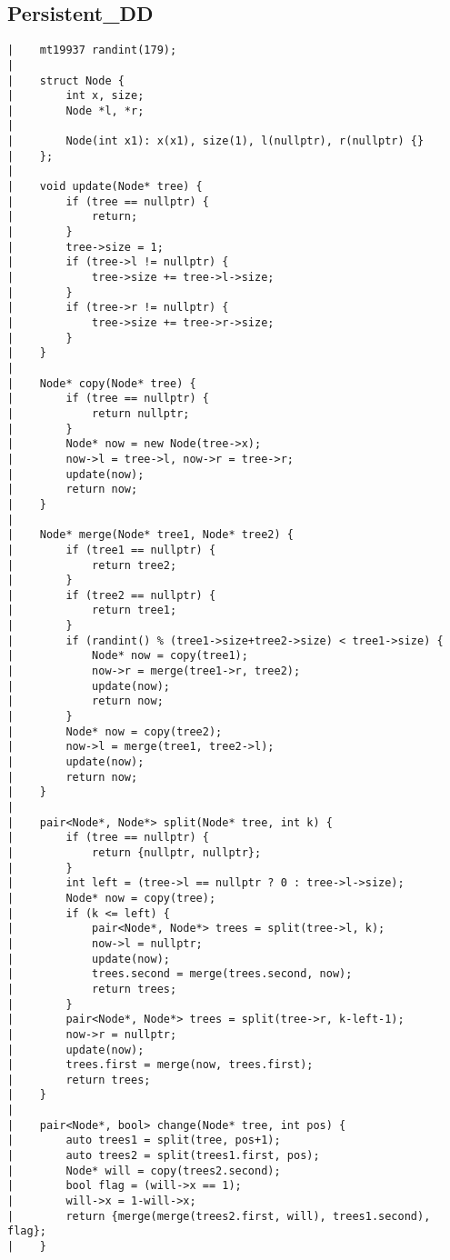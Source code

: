 \documentclass[a4paper, 10pt]{article}
\begin{document}
\begin{center}
\section*{Persistent\_DD}
\begin{verbatim}
|    mt19937 randint(179);
|    
|    struct Node {
|        int x, size;
|        Node *l, *r;
|    
|        Node(int x1): x(x1), size(1), l(nullptr), r(nullptr) {}
|    };
|    
|    void update(Node* tree) {
|        if (tree == nullptr) {
|            return;
|        }
|        tree->size = 1;
|        if (tree->l != nullptr) {
|            tree->size += tree->l->size;
|        }
|        if (tree->r != nullptr) {
|            tree->size += tree->r->size;
|        }
|    }
|    
|    Node* copy(Node* tree) {
|        if (tree == nullptr) {
|            return nullptr;
|        }
|        Node* now = new Node(tree->x);
|        now->l = tree->l, now->r = tree->r;
|        update(now);
|        return now;
|    }
|    
|    Node* merge(Node* tree1, Node* tree2) {
|        if (tree1 == nullptr) {
|            return tree2;
|        }
|        if (tree2 == nullptr) {
|            return tree1;
|        }
|        if (randint() % (tree1->size+tree2->size) < tree1->size) {
|            Node* now = copy(tree1);
|            now->r = merge(tree1->r, tree2);
|            update(now);
|            return now;
|        }
|        Node* now = copy(tree2);
|        now->l = merge(tree1, tree2->l);
|        update(now);
|        return now;
|    }
|    
|    pair<Node*, Node*> split(Node* tree, int k) {
|        if (tree == nullptr) {
|            return {nullptr, nullptr};
|        }
|        int left = (tree->l == nullptr ? 0 : tree->l->size);
|        Node* now = copy(tree);
|        if (k <= left) {
|            pair<Node*, Node*> trees = split(tree->l, k);
|            now->l = nullptr;
|            update(now);
|            trees.second = merge(trees.second, now);
|            return trees;
|        }
|        pair<Node*, Node*> trees = split(tree->r, k-left-1);
|        now->r = nullptr;
|        update(now);
|        trees.first = merge(now, trees.first);
|        return trees;
|    }
|    
|    pair<Node*, bool> change(Node* tree, int pos) {
|        auto trees1 = split(tree, pos+1);
|        auto trees2 = split(trees1.first, pos);
|        Node* will = copy(trees2.second);
|        bool flag = (will->x == 1);
|        will->x = 1-will->x;
|        return {merge(merge(trees2.first, will), trees1.second), flag};
|    }
\end{verbatim}

\newpage

\end{center}
\end{document}
